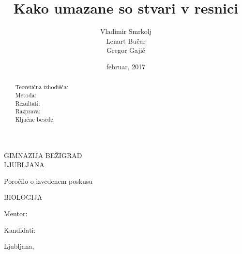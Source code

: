 \documentclass[12pt, a4paper]{report}
\begin{document}
\title{Kako umazane so stvari v resnici}
\author{Vladimir Smrkolj\\Lenart Bučar\\Gregor Gajič}
\date{februar, 2017}

\sffamily

\begin{titlepage}
\centering


{\Large{GIMNAZIJA BEŽIGRAD\\[2mm]LJUBLJANA}}

\vspace{3.5cm}

{\large Poročilo o izvedenem poskusu

\vspace{1cm}

BIOLOGIJA
}

\vspace{3.5cm}

\makeatletter
{\LARGE{\textbf{\@title}}}
\makeatother


\vfill


\parbox{4cm}{Mentor:}
\hfill
\makeatletter
Kandidati: \parbox[t]{3cm}{\@author}
\makeatother

\vspace{3cm}

\makeatletter
Ljubljana, \@date
\makeatother

\end{titlepage}

\rhead{\parbox{2cm}{\today}\thepage}

\begin{abstract}
\begin{description}

\item[Teoretična izhodišča:]

\item[Metoda:]

\item[Rezultati:]

\item[Razprava:]

\item[Ključne besede:]

\end{description}
\end{abstract}

\tableofcontents
\end{document}

